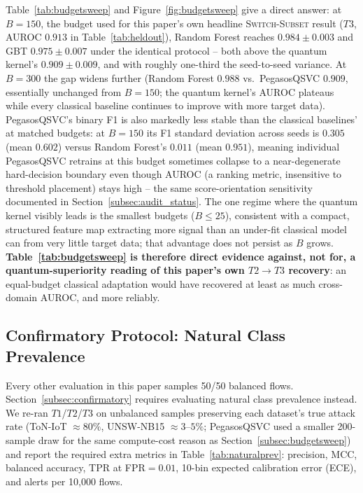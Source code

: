 \documentclass[conference]{IEEEtran}
\begin{document}
Table~\ref{tab:budgetsweep} and Figure~\ref{fig:budgetsweep} give a
direct answer: at $B{=}150$, the budget used for this paper's own
headline \textsc{Switch-Subset} result ($T3$, AUROC $0.913$ in
Table~\ref{tab:heldout}), Random Forest reaches $0.984\pm0.003$ and GBT
$0.975\pm0.007$ under the identical protocol -- both above the quantum
kernel's $0.909\pm0.009$, and with roughly one-third the seed-to-seed
variance. At $B{=}300$ the gap widens further (Random Forest
$0.988$ vs.\ PegasosQSVC $0.909$, essentially unchanged from $B{=}150$;
the quantum kernel's AUROC plateaus while every classical baseline
continues to improve with more target data). PegasosQSVC's binary F1 is
also markedly less stable than the classical baselines' at matched
budgets: at $B{=}150$ its F1 standard deviation across seeds is
$0.305$ (mean $0.602$) versus Random Forest's $0.011$ (mean $0.951$),
meaning individual PegasosQSVC retrains at this budget sometimes
collapse to a near-degenerate hard-decision boundary even though AUROC
(a ranking metric, insensitive to threshold placement) stays high --
the same score-orientation sensitivity documented in
Section~\ref{subsec:audit_status}. The one regime where the quantum
kernel visibly leads is the smallest budgets ($B\le25$), consistent with
a compact, structured feature map extracting more signal than an
under-fit classical model can from very little target data; that
advantage does not persist as $B$ grows. \textbf{Table~\ref{tab:budgetsweep}
is therefore direct evidence against, not for, a quantum-superiority
reading of this paper's own $T2\to T3$ recovery}: an equal-budget
classical adaptation would have recovered at least as much cross-domain
AUROC, and more reliably.

\subsection{Confirmatory Protocol: Natural Class Prevalence}
\label{subsec:naturalprev}

Every other evaluation in this paper samples 50/50 balanced flows.
Section~\ref{subsec:confirmatory} requires evaluating natural class
prevalence instead. We re-ran $T1$/$T2$/$T3$ on unbalanced samples
preserving each dataset's true attack rate (ToN-IoT $\approx80\%$,
UNSW-NB15 $\approx3$--$5\%$; PegasosQSVC used a smaller 200-sample draw
for the same compute-cost reason as Section~\ref{subsec:budgetsweep}) and
report the required extra metrics in Table~\ref{tab:naturalprev}:
precision, MCC, balanced accuracy, TPR at FPR${=}0.01$, 10-bin expected
calibration error (ECE), and alerts per 10,000 flows.
\end{document}

